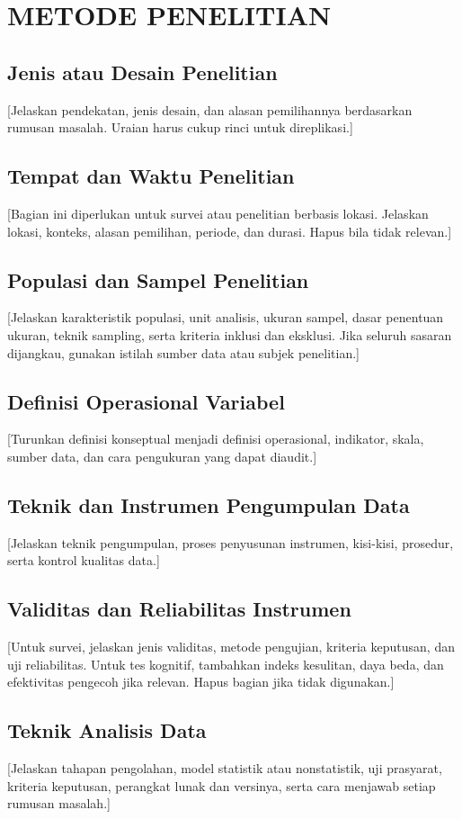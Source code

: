 \chapter{METODE PENELITIAN}

\section{Jenis atau Desain Penelitian}

[Jelaskan pendekatan, jenis desain, dan alasan pemilihannya berdasarkan rumusan
masalah. Uraian harus cukup rinci untuk direplikasi.]

\section{Tempat dan Waktu Penelitian}

[Bagian ini diperlukan untuk survei atau penelitian berbasis lokasi. Jelaskan
lokasi, konteks, alasan pemilihan, periode, dan durasi. Hapus bila tidak relevan.]

\section{Populasi dan Sampel Penelitian}

[Jelaskan karakteristik populasi, unit analisis, ukuran sampel, dasar penentuan
ukuran, teknik sampling, serta kriteria inklusi dan eksklusi. Jika seluruh
sasaran dijangkau, gunakan istilah sumber data atau subjek penelitian.]

\section{Definisi Operasional Variabel}

[Turunkan definisi konseptual menjadi definisi operasional, indikator, skala,
sumber data, dan cara pengukuran yang dapat diaudit.]

\section{Teknik dan Instrumen Pengumpulan Data}

[Jelaskan teknik pengumpulan, proses penyusunan instrumen, kisi-kisi, prosedur,
serta kontrol kualitas data.]

\section{Validitas dan Reliabilitas Instrumen}

[Untuk survei, jelaskan jenis validitas, metode pengujian, kriteria keputusan,
dan uji reliabilitas. Untuk tes kognitif, tambahkan indeks kesulitan, daya beda,
dan efektivitas pengecoh jika relevan. Hapus bagian jika tidak digunakan.]

\section{Teknik Analisis Data}

[Jelaskan tahapan pengolahan, model statistik atau nonstatistik, uji prasyarat,
kriteria keputusan, perangkat lunak dan versinya, serta cara menjawab setiap
rumusan masalah.]
